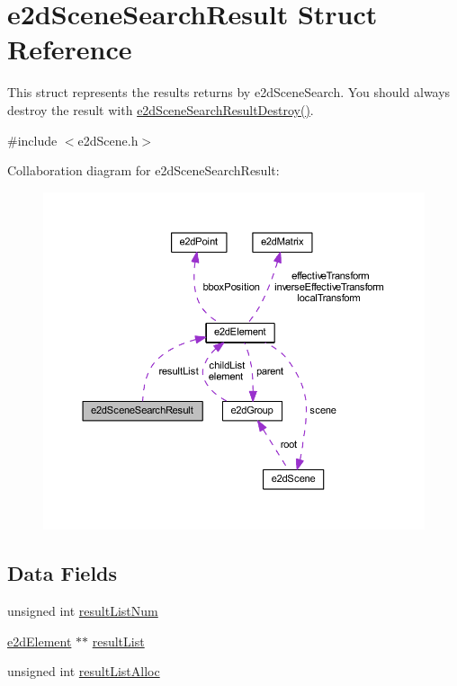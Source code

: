 \hypertarget{structe2dSceneSearchResult}{\section{e2d\-Scene\-Search\-Result Struct Reference}
\label{structe2dSceneSearchResult}
}


This struct represents the results returns by e2d\-Scene\-Search. You should always destroy the result with \hyperlink{group__e2dScene_ga0eedd7c50a3d65e91abd54fcee3de39d}{e2d\-Scene\-Search\-Result\-Destroy()}.  




{\ttfamily \#include $<$e2d\-Scene.\-h$>$}



Collaboration diagram for e2d\-Scene\-Search\-Result\-:\nopagebreak
\begin{figure}[H]
\begin{center}
\leavevmode
\includegraphics[width=350pt]{structe2dSceneSearchResult__coll__graph}
\end{center}
\end{figure}
\subsection*{Data Fields}
\begin{DoxyCompactItemize}
\item 
unsigned int \hyperlink{structe2dSceneSearchResult_a65874957dc9197a16158b3807acb5d1e}{result\-List\-Num}
\item 
\hyperlink{structe2dElement}{e2d\-Element} $\ast$$\ast$ \hyperlink{structe2dSceneSearchResult_acb54f0ae39cc6710460aa41f5f0afd9f}{result\-List}
\item 
unsigned int \hyperlink{structe2dSceneSearchResult_a0b7370bba258bd87e0d7ae10af711d34}{result\-List\-Alloc}
\end{DoxyCompactItemize}



